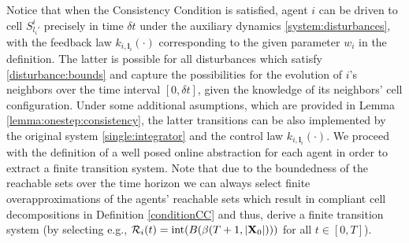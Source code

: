 \documentclass[reqno]{amsart}
\theoremstyle{plain}
\theoremstyle{definition}
\numberwithin{equation}{section}
\begin{document}
Notice that when the Consistency Condition is satisfied, agent $i$ can be driven to cell $S_{l_i'}^i$ precisely in time $\delta t$ under the auxiliary dynamics \eqref{system:disturbances}, with the feedback law $k_{i,{\textbf{{l}}}_i}(\cdot)$ corresponding to the given parameter $w_i$ in the definition. The latter is possible for all disturbances which satisfy \eqref{disturbance:bounds} and capture the possibilities for the evolution of $i$'s neighbors over the time interval $[0,\delta t]$, given the knowledge of its neighbors' cell configuration. Under some additional asumptions, which are provided in Lemma \ref{lemma:onestep:consistency}, the latter transitions can be also implemented by the original system \eqref{single:integrator} and the control law $k_{i,{\textbf{{l}}}_i}(\cdot)$. We proceed with the definition of a well posed online abstraction for each agent in order to extract a finite transition system. Note that due to the boundedness of the reachable sets over the time horizon we can always select finite overapproximations of the agents' reachable sets which result in compliant cell decompositions in Definition \ref{conditionCC} and thus, derive a finite transition system (by selecting e.g., ${\ensuremath{\mathcal{R}}}_i(t)={\rm int}(B(\beta(T+1,|{\textbf{{X}}}_0|)))$ for all $t\in[0,T]$).
\end{document}

